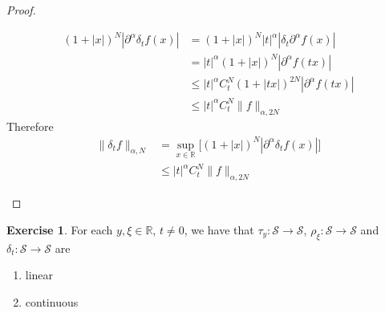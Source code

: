 \documentclass[12pt]{amsart}
\theoremstyle{definition}
\newtheorem{ex}[definition]{Exercise}
\newcommand{\p}{\partial}
\newcommand{\al}{\alpha}
\newcommand{\del}{\delta}
\newcommand{\R}{\mathbb{R}}
\newcommand{\MS}{\mathcal{S}}
\begin{document}
\begin{proof}
\begin{enumerate}
			\begin{align*}
				(1 + |x|)^N |\p^{\al} \del_t f(x)| 
				& = (1 + |x|)^N |t|^{\al}|\del_t \p^{\al} f(x)| \\
				& = |t|^{\al} (1 + |x|)^N |\p^{\al} f(tx)| \\
				& \leq |t|^{\al} C_t^N(1 + |tx|)^{2N} | \p^{\al} f(tx)| \\
				& \leq |t|^{\al} C_t^N\|f\|_{\al, 2N}
			\end{align*}
			Therefore 
			\begin{align*}
				\|\del_tf\|_{\al, N} 
				& = \sup_{x \in \R} \bigg[(1 + |x|)^N |\p^{\al} \del_t f(x)|  \bigg] \\
				& \leq |t|^{\al} C_t^N\|f\|_{\al, 2N}
			\end{align*}
		\end{enumerate}
	\end{proof}

	\begin{ex} For each $y, \xi \in \R$, $t \neq 0$, we have that $\tau_y: \MS \rightarrow \MS$, $\rho_{\xi}: \MS \rightarrow \MS$ and $\del_t: \MS \rightarrow \MS$ are 
		\begin{enumerate}
			\item linear
			\item continuous
		\end{enumerate}
	\end{ex}
\end{document}
